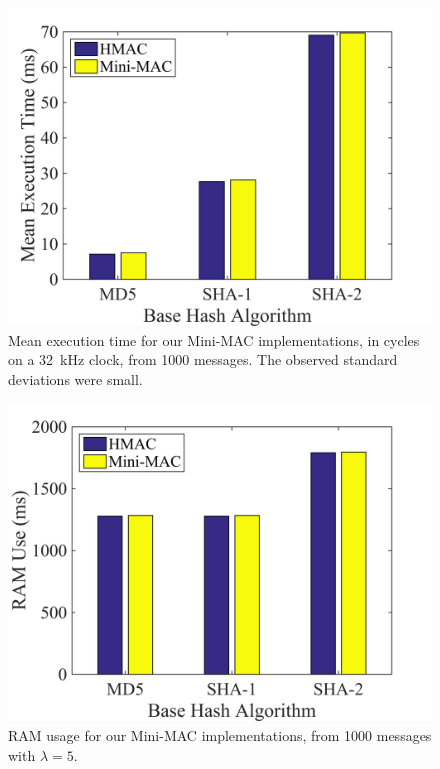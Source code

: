 	\begin{figure}
		\centering
		\includegraphics[width=\columnwidth]{figures/exec_cycles.png}
		\caption{Mean execution time for our Mini-MAC implementations, in cycles on a 32~kHz clock,
		from 1000 messages.  The observed standard deviations were small.}
		\label{fig-execution}
	\end{figure}
	
	\begin{figure}
		\centering
		\includegraphics[width=\columnwidth]{figures/ram_usage.png}
		\caption{RAM usage for our Mini-MAC implementations, from 1000 messages with $\lambda=5$.}
		\label{fig-ram}
	\end{figure}
	
